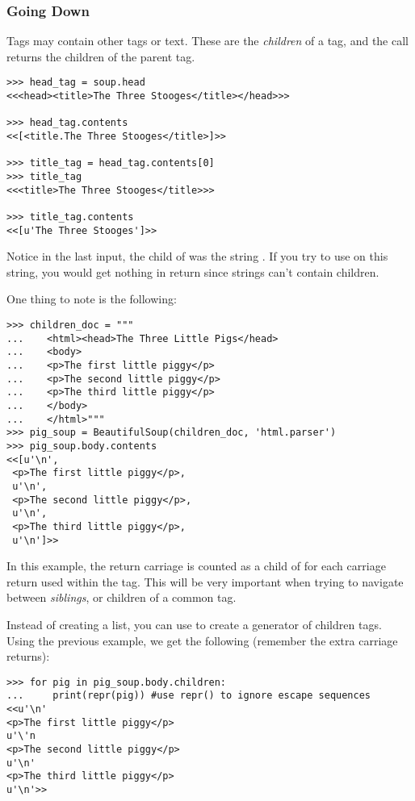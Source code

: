 \subsubsection{Going Down}

Tags may contain other tags or text.
These are the \textit{children} of a tag, and the call  returns the children of the parent tag.
\begin{lstlisting}
>>> head_tag = soup.head
<<<head><title>The Three Stooges</title></head>>>

>>> head_tag.contents
<<[<title.The Three Stooges</title>]>>

>>> title_tag = head_tag.contents[0]
>>> title_tag
<<<title>The Three Stooges</title>>>

>>> title_tag.contents
<<[u'The Three Stooges']>>
\end{lstlisting}
Notice in the last input, the child of  was the string .
If you try to use  on this string, you would get nothing in return since strings can't contain children.

\begin{info}
One thing to note is the following:
\begin{lstlisting}
>>> children_doc = """
...    <html><head>The Three Little Pigs</head>
...    <body>
...    <p>The first little piggy</p>
...    <p>The second little piggy</p>
...    <p>The third little piggy</p>
...    </body>
...    </html>"""
>>> pig_soup = BeautifulSoup(children_doc, 'html.parser')
>>> pig_soup.body.contents
<<[u'\n',
 <p>The first little piggy</p>,
 u'\n',
 <p>The second little piggy</p>,
 u'\n',
 <p>The third little piggy</p>,
 u'\n']>>
\end{lstlisting}
In this example, the return carriage is counted as a child of  for each carriage return used within the  tag.
This will be very important when trying to navigate between \textit{siblings}, or children of a common tag.
\end{info}

Instead of creating a list, you can use  to create a generator of children tags.
Using the previous example, we get the following (remember the extra carriage returns):
\begin{lstlisting}
>>> for pig in pig_soup.body.children:
...     print(repr(pig)) #use repr() to ignore escape sequences
<<u'\n'
<p>The first little piggy</p>
u'\'n
<p>The second little piggy</p>
u'\n'
<p>The third little piggy</p>
u'\n'>>
\end{lstlisting}

